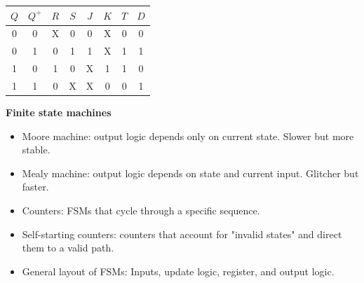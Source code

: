 \documentclass{article}
\begin{document}
\begin{tabular}{|cc|cc|cc|c|c|}
    \hline
    $Q$ & $Q^+$ & $R$ & $S$ & $J$ & $K$ & $T$ & $D$ \\
    \hline
    0 & 0 & X & 0 & 0 & X & 0 & 0 \\
    0 & 1 & 0 & 1 & 1 & X & 1 & 1 \\
    1 & 0 & 1 & 0 & X & 1 & 1 & 0 \\
    1 & 1 & 0 & X & X & 0 & 0 & 1 \\
    \hline
\end{tabular}
\textbf{Finite state machines}
\begin{itemize}
    \item Moore machine: output logic depends only on current state. Slower but more stable.
    \item Mealy machine: output logic depends on state and current input. Glitcher but faster.
    \item Counters: FSMs that cycle through a specific sequence.
    \item Self-starting counters: counters that account for "invalid states" and direct them to a valid path.
    \item General layout of FSMs: Inputs, update logic, register, and output logic.
\end{itemize}
\end{document}
